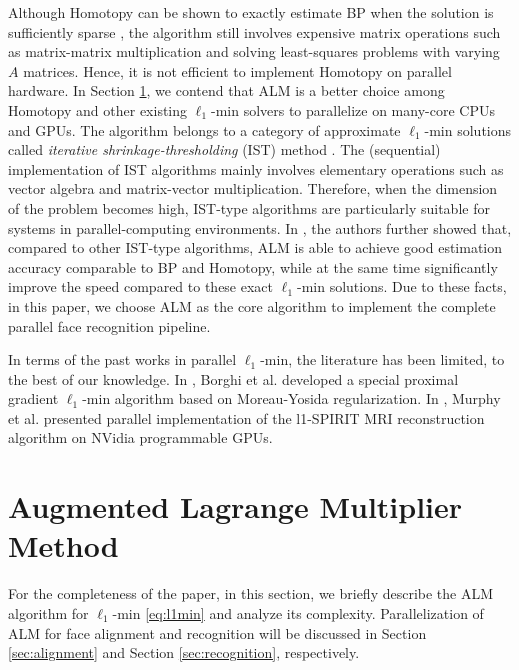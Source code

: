 \documentclass[10pt,twocolumn,letterpaper]{article}
\begin{document}
Although Homotopy can be shown to exactly estimate BP when the solution is sufficiently sparse \cite{DonohoD2006}, the algorithm still involves expensive matrix operations such as matrix-matrix multiplication and solving least-squares problems with varying $A$ matrices. Hence, it is not efficient to implement Homotopy on parallel hardware. In Section \ref{sec:ALM}, we contend that ALM is a better choice among Homotopy and other existing $\ell_1$-min solvers to parallelize on many-core CPUs and GPUs. The algorithm belongs to a category of approximate $\ell_1$-min solutions called \emph{iterative shrinkage-thresholding} (IST) method \cite{WrightS2008,BeckA2009}. The (sequential) implementation of IST algorithms mainly involves elementary operations such as vector algebra and matrix-vector multiplication. Therefore, when the dimension of the problem becomes high, IST-type algorithms are particularly suitable for systems in parallel-computing environments. In \cite{YangA2010-ICIP}, the authors further showed that, compared to other IST-type algorithms, ALM is able to achieve good estimation accuracy comparable to BP and Homotopy, while at the same time significantly improve the speed compared to these exact $\ell_1$-min solutions. Due to these facts, in this paper, we choose ALM as the core algorithm to implement the complete parallel face recognition pipeline.

In terms of the past works in parallel $\ell_1$-min, the literature has been limited, to the best of our knowledge. In \cite{BorghiA2010}, Borghi et al. developed a special proximal gradient $\ell_1$-min algorithm based on Moreau-Yosida regularization. In \cite{MurphyM2010}, Murphy et al. presented parallel implementation of the l1-SPIRIT MRI reconstruction algorithm on NVidia programmable GPUs.


\section{Augmented Lagrange Multiplier Method}
\label{sec:ALM}

For the completeness of the paper, in this section, we briefly describe the ALM algorithm for $\ell_1$-min \eqref{eq:l1min} \cite{YangA2010-ICIP} and analyze its complexity. Parallelization of ALM for face alignment and recognition will be discussed in Section \ref{sec:alignment} and Section \ref{sec:recognition}, respectively.
\end{document}
